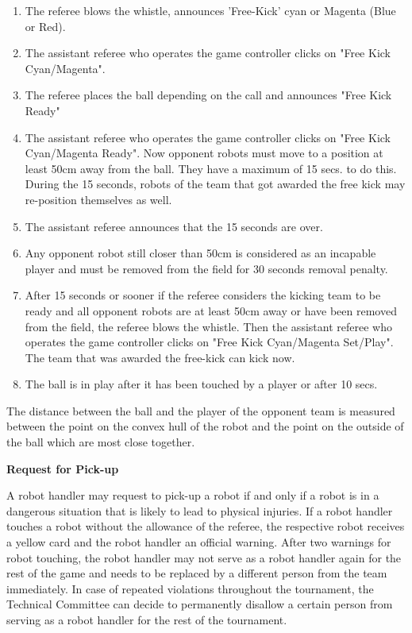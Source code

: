 \begin{enumerate}
\item The referee blows the whistle, announces 'Free-Kick' cyan or Magenta (Blue or Red).
\item The assistant referee who operates the game controller clicks on "Free Kick Cyan/Magenta".
\item The referee places the ball depending on the call and announces "Free Kick Ready"
\item The assistant referee who operates the game controller clicks on "Free Kick Cyan/Magenta Ready". Now opponent robots must move to a position at least 50cm away from the ball. They have a maximum of 15 secs. to do this.  During the 15 seconds, robots of the team that got awarded the free kick may re-position themselves as well.
\item The assistant referee announces that the 15 seconds are over.
\item Any opponent robot still closer than 50cm is considered as an incapable player and must be removed from the field for 30 seconds removal penalty.
\item After 15 seconds or sooner if the referee considers the kicking team to be ready and all opponent robots are at least 50cm away or have been removed from the field, the referee blows the whistle. Then the assistant referee who operates the game controller clicks on "Free Kick Cyan/Magenta Set/Play". The team that was awarded the free-kick can kick now.
\item The ball is in play after it has been touched by a player or after 10 secs.
\end{enumerate}

The distance between the ball and the player of the opponent team is measured between the point on the convex hull of the robot and the point on the outside of the ball which are most close together.

\color{black}

\bigskip


{\bfseries Request for Pick-up}

A robot handler may request to pick-up a robot if and only if a robot is in a dangerous situation that is likely to lead to physical injuries. If a robot handler touches a robot without the allowance of the referee, the respective robot receives a yellow card and the robot handler an official warning. After two warnings for robot touching, the robot handler may not serve as a robot handler again for the rest of the game and needs to be replaced by a different person from the team immediately. In case of repeated violations throughout the tournament, the Technical Committee can decide to permanently disallow a certain person from serving as a robot handler for the rest of the tournament.
\color{black}


